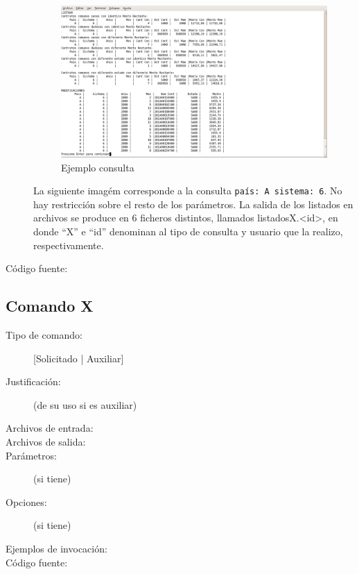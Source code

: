 \documentclass[12pt]{article}
\begin{document}
\begin{description}
	\begin{figure}[H]
	\centering
	\includegraphics[scale=0.35]{imagenes/reporte/reporte_listadosYModificaciones_A_6.png}
	\caption{Ejemplo consulta}
	\end{figure}

        La siguiente imagém corresponde a la consulta \verb|país: A sistema: 6|.
        No hay restricción sobre el resto de los parámetros.
        La salida de los listados en archivos se produce en 6 ficheros distintos, llamados listadosX.<id>, en donde ``X'' e ``id'' denominan al tipo de consulta y usuario que la realizo, respectivamente. 


	\item [Código fuente:]

\end{description}
{\footnotesize

}

\subsection{Comando X}
\begin{description}
	\item [Tipo de comando:] [Solicitado | Auxiliar]
	
	\item [Justificación:] (de su uso si es auxiliar)
	
	\item [Archivos de entrada:]
	
	\item [Archivos de salida:]
	
	\item [Parámetros:] (si tiene)
	
	\item [Opciones:] (si tiene)
	
	\item [Ejemplos de invocación:]
	
	\item [Código fuente:]
\end{description}
{\footnotesize
%
}
\end{document}
